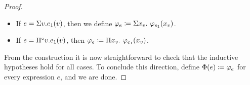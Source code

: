 \begin{proof}
\begin{itemize}
	\item If $e=\Sigma v. e_1(v)$, then we define $\varphi_e \coloneqq  \Sigma x_{v}. \  \varphi_{e_1}(x_v)$.

  \item If $e=\Pi^{\circ} v. e_1(v)$, then $\varphi_e \coloneqq  \Pi x_{v}.\  \varphi_{e_1}(x_v)$.
\end{itemize}
From the construction it is now straightforward to check that the inductive hypotheses hold for all cases. To conclude this direction, define $\Phi(e) \coloneqq  \varphi_e$ for every expression $e$, and we are done.

\medskip

\newcommand{\evarphi}{e_\varphi}


\end{proof}
